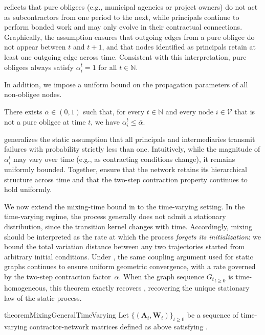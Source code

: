 \documentclass[mnsc,nonblindrev]{informs3}
\newcommand{\NN}{\mathbb{N}}
\newcommand{\V}{\mathcal{V}}
\newcommand{\A}{\mathbf{A}}
\newcommand{\W}{\mathbf{W}}
\begin{document}
\begin{APPENDICES}
 reflects that pure obligees (e.g., municipal agencies or project owners) do not act as subcontractors from one period to the next, while principals continue to perform bonded work and may only evolve in their contractual connections.
Graphically, the assumption ensures that outgoing edges from a pure obligee do not appear between $t$ and $t+1$, and that nodes identified as principals retain at least one outgoing edge across time.
Consistent with this interpretation, pure obligees always satisfy $\alpha_i^t = 1$ for all $t \in \NN$.

In addition, we impose a uniform bound on the propagation parameters of all non-obligee nodes.

\begin{assumption}
\label{ass:alpha_uniform_bound}
There exists $\bar\alpha \in (0,1)$ such that, for every $t \in \NN$ and every node $i \in \V$ that is not a pure obligee at time $t$, we have $\alpha_i^t \le \bar\alpha$.
\end{assumption}

 generalizes the static assumption that all principals and intermediaries transmit failures with probability strictly less than one.
Intuitively, while the magnitude of $\alpha_i^t$ may vary over time (e.g., as contracting conditions change), it remains uniformly bounded.
Together,  ensure that the network retains its hierarchical structure across time and that the two-step contraction property continues to hold uniformly.


We now extend the mixing-time bound in  to the time-varying setting.
In the time-varying regime, the process generally does not admit a stationary distribution, since the transition kernel changes with time.  Accordingly, mixing should be interpreted as the rate at which the process {\em forgets its initialization}: we bound the total variation distance between any two trajectories started from arbitrary initial conditions.  
Under , the same coupling argument used for static graphs continues to ensure uniform geometric convergence, with a rate governed by the two-step contraction factor~$\bar\alpha$.
When the graph sequence ${G_t}_{t \ge 0}$ is time-homogeneous, this theorem exactly recovers , recovering the unique stationary law of the static process.

\begin{restatable}{theorem}{MixingGeneralTimeVarying}
\label{thm:mixing_time_tv}
Let $\{(\A_t,\W_t)\}_{t\ge0}$ be a sequence of time-varying contractor-network matrices defined as above satisfying .


\end{restatable}
\end{APPENDICES}
\end{document}
